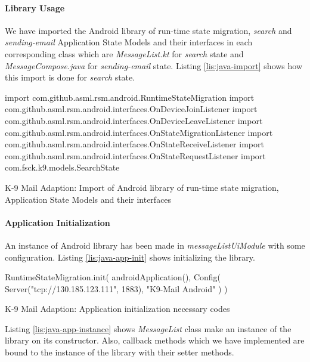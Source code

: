 
\paragraph{Library Usage}
We have imported the Android library of run-time state migration, \textit{search} and \textit{sending-email} Application State Models and their interfaces in each corresponding class which are \textit{MessageList.kt} for \textit{search} state and \textit{MessageCompose.java} for \textit{sending-email} state. Listing \ref{lis:java-import} shows how this import is done for \textit{search} state.

\FloatBarrier
\begin{code}
\begin{javas}
import com.github.asml.rsm.android.RuntimeStateMigration
import com.github.asml.rsm.android.interfaces.OnDeviceJoinListener
import com.github.asml.rsm.android.interfaces.OnDeviceLeaveListener
import com.github.asml.rsm.android.interfaces.OnStateMigrationListener
import com.github.asml.rsm.android.interfaces.OnStateReceiveListener
import com.github.asml.rsm.android.interfaces.OnStateRequestListener
import com.fsck.k9.models.SearchState
\end{javas}
\caption{K-9 Mail Adaption: Import of Android library of run-time state migration, Application State Models and their interfaces}
\label{lis:java-import}
\end{code}
\FloatBarrier

\paragraph{Application Initialization}
An instance of Android library has been made in \textit{messageListUiModule} with some configuration. Listing \ref{lis:java-app-init} shows initializing the library.

\FloatBarrier
\begin{code}
\begin{java}
RuntimeStateMigration.init(
        androidApplication(),
        Config(
            Server("tcp://130.185.123.111", 1883),
            "K9-Mail Android"
        )
)
\end{java}
\caption{K-9 Mail Adaption: Application initialization necessary codes}
\label{lis:java-app-init}
\end{code}
\FloatBarrier

Listing \ref{lis:java-app-instance} shows \textit{MessageList} class make an instance of the library on its constructor. Also, callback methods which we have implemented are bound to the instance of the library with their setter methods. 

